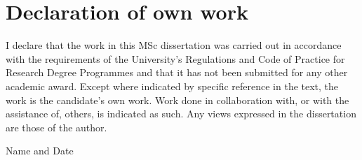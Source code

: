 \chapter*{Declaration of own work}

I declare that the work in this MSc dissertation was carried out in accordance with the requirements of  the University's Regulations and Code of Practice for Research Degree Programmes and that it  has not been submitted for any other academic award. Except where indicated by specific  reference in the text, the work is the candidate's own work. Work done in collaboration with, or with the assistance of, others, is indicated as such. Any views expressed in the dissertation are those of the author.


 \begin{flushright}
 
 Name and Date
\end{flushright}
